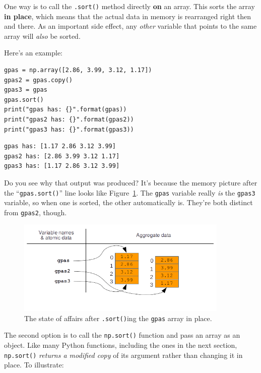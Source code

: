 One way is to call the \texttt{.sort()} method directly \textbf{on} an array.
This sorts the array \textbf{in place}, which means that the actual data in
memory is rearranged right then and there. As an important side effect, any
\textit{other} variable that points to the same array will \textit{also} be
sorted.

Here's an example:

\begin{Verbatim}[fontsize=\small,samepage=true,frame=single,framesep=3mm]
gpas = np.array([2.86, 3.99, 3.12, 1.17])
gpas2 = gpas.copy()
gpas3 = gpas
gpas.sort()
print("gpas has: {}".format(gpas))
print("gpas2 has: {}".format(gpas2))
print("gpas3 has: {}".format(gpas3))
\end{Verbatim}

\begin{Verbatim}[fontsize=\small,samepage=true,frame=leftline,framesep=5mm,framerule=1mm]
gpas has: [1.17 2.86 3.12 3.99]
gpas2 has: [2.86 3.99 3.12 1.17]
gpas3 has: [1.17 2.86 3.12 3.99]
\end{Verbatim}

Do you see why that output was produced? It's because the memory picture after
the ``\texttt{gpas.sort()}'' line looks like Figure~\ref{fig:dotSortArray}. The
\texttt{gpas} variable really \textit{is} the \texttt{gpas3} variable, so when
one is sorted, the other automatically is. They're both distinct from
\texttt{gpas2}, though.

\begin{figure}[ht]
\centering
\includegraphics[width=0.9\textwidth]{dotSortArray.png}
\caption{The state of affairs after \texttt{.sort()}ing the \texttt{gpas} array in place.}
\label{fig:dotSortArray}
\end{figure}

The second option is to call the \texttt{np.sort()} function and pass an array
as an object. Like many Python functions, including the ones in the next
section, \texttt{np.sort()} \textit{returns a modified copy} of its argument
rather than changing it in place. To illustrate:

